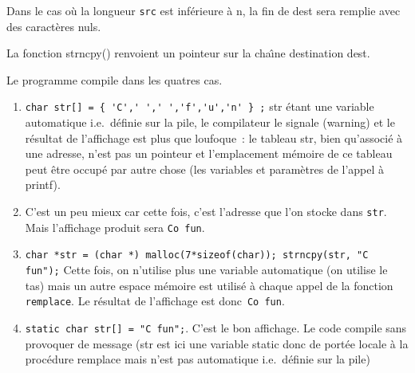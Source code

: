 Dans le cas o\`u la longueur \verb+src+ est inf\'erieure \`a n, la fin de dest
sera remplie avec des caract\`eres nuls.

La fonction strncpy() renvoient un pointeur sur la cha\^\i{}ne
destination dest.

\ifcorrection
Le programme compile dans les quatres cas.
\begin{enumerate}
\item \verb+char str[] = { 'C',' ',' ','f','u','n' } ;+ str \'etant une variable
  automatique i.e.\ d\'efinie sur la pile, le compilateur le signale
  (warning) et le r\'esultat de l'affichage est plus que loufoque~: le
  tableau str, bien qu'associ\'e \`a une adresse, n'est pas un
  pointeur et l'emplacement m\'emoire de ce tableau peut \^etre
  occup\'e par autre chose (les variables et param\`etres de l'appel
  \`a printf).
\item C'est un peu mieux car cette fois, c'est l'adresse que l'on
  stocke dans \verb+str+. Mais l'affichage produit sera \verb+Co fun+.
\item \verb+char *str = (char *) malloc(7*sizeof(char)); strncpy(str, "C  fun");+
  Cette fois, on n'utilise plus une variable automatique (on utilise
  le tas) mais un autre espace m\'emoire est utilis\'e \`a chaque
  appel de la fonction \verb+remplace+. Le r\'esultat de l'affichage est
  donc~\verb+Co fun+.
\item \verb+static char str[] = "C fun";+.  
  C'est le bon affichage.  Le code compile sans provoquer de message
  (str est ici une variable static donc de port\'ee locale \`a la
  proc\'edure remplace mais n'est pas automatique i.e.\ d\'efinie sur
  la pile) 
\end{enumerate}
\fi
